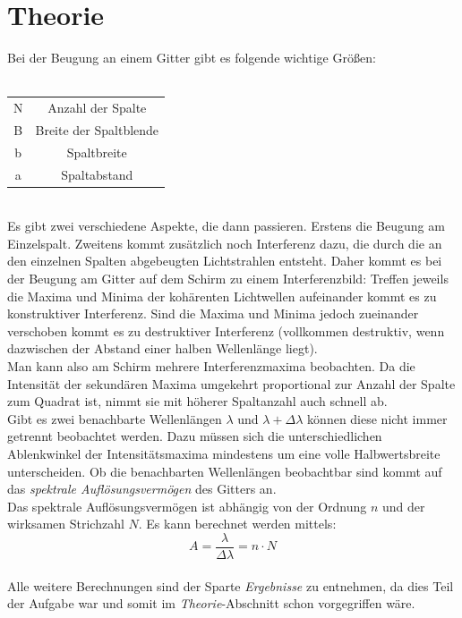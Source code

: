\documentclass{article}
\begin{document}
\section{Theorie}
Bei der Beugung an einem Gitter gibt es folgende wichtige Größen:\\
\\
\begin{tabular}{|c|c|}
\hline
N & Anzahl der Spalte\\
B & Breite der Spaltblende\\
b & Spaltbreite\\
a & Spaltabstand\\
\hline
\end{tabular}
\vspace{0.5cm}
\\
Es gibt zwei verschiedene Aspekte, die dann passieren. Erstens die Beugung am Einzelspalt. Zweitens kommt zusätzlich noch Interferenz dazu, die durch die an den einzelnen Spalten abgebeugten Lichtstrahlen entsteht. Daher kommt es bei der Beugung am Gitter auf dem Schirm zu einem Interferenzbild: Treffen jeweils die Maxima und Minima der kohärenten Lichtwellen aufeinander kommt es zu konstruktiver Interferenz. Sind die Maxima und Minima jedoch zueinander verschoben kommt es zu destruktiver Interferenz (vollkommen destruktiv, wenn dazwischen der Abstand einer halben Wellenlänge liegt).\\
Man kann also am Schirm mehrere Interferenzmaxima beobachten. Da die Intensität der sekundären Maxima umgekehrt proportional zur Anzahl der Spalte zum Quadrat ist, nimmt sie mit höherer Spaltanzahl auch schnell ab.\\
Gibt es zwei benachbarte Wellenlängen $\lambda$ und $\lambda+\Delta\lambda$ können diese nicht immer getrennt beobachtet werden. Dazu müssen sich die unterschiedlichen Ablenkwinkel der Intensitätsmaxima mindestens um eine volle Halbwertsbreite unterscheiden. Ob die benachbarten Wellenlängen beobachtbar sind kommt auf das \textit{spektrale Auflösungsvermögen} des Gitters an.\\
Das spektrale Auflösungsvermögen ist abhängig von der Ordnung $n$ und der wirksamen Strichzahl $N$. Es kann berechnet werden mittels:
$$A=\frac{\lambda}{\Delta\lambda}=n\cdot N$$
\\
Alle weitere Berechnungen sind der Sparte \textit{Ergebnisse} zu entnehmen, da dies Teil der Aufgabe war und somit im \textit{Theorie}-Abschnitt schon vorgegriffen wäre.
\end{document}
